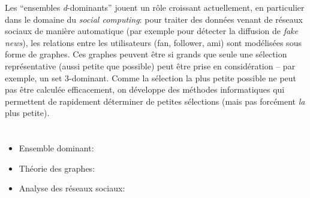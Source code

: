 {{Les “ensembles \emph{d}-dominants” jouent un rôle croissant actuellement, en particulier dans le domaine du \emph{social computing}: pour traiter des données venant de réseaux sociaux de manière automatique (par exemple pour détecter la diffusion de \emph{fake news}), les relations entre les utilisateurs (fan, follower, ami) sont modélisées sous forme de graphes. Ces graphes peuvent être si grands que seule une sélection représentative (aussi petite que possible) peut être prise en considération – par exemple, un set 3-dominant. Comme la sélection la plus petite possible ne peut pas être calculée efficacement, on développe des méthodes informatiques qui permettent de rapidement déterminer de petites sélections (mais pas forcément \emph{la} plus petite).



\section*{\BrochureWebsitesAndKeywords}
{\raggedright
\begin{itemize}
  \item Ensemble dominant: \href{https://fr.wikipedia.org/wiki/Ensemble_dominant}{}
  \item Théorie des graphes: \href{https://fr.wikipedia.org/wiki/Th\%C3\%A9orie_des_graphes}{}
  \item Analyse des réseaux sociaux: \href{https://fr.wikipedia.org/wiki/Analyse_des_r\%C3\%A9seaux_sociaux}{}
\end{itemize}


}

}{}

\def\AuthorBarichelloL{} %
\def\AuthorNataliaN{} %
\def\AuthorLunaC{} %
\def\AuthorAlbaradeiS{} %
\def\AuthorPohlW{} %
\def\AuthorDatzkoThutS{} %
\def\AuthorPelletE{} %

\newpage}{}
